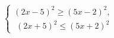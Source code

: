 \begin{ex}[type=ineq_system]
	\begin{condition}
		$\begin{cases} (2x - 5)^2\geqslant(5x - 2)^2 ,\\
			\; (2x + 5)^2\leqslant(5x + 2)^2 
		\end{cases}$
	\end{condition}
\end{ex}